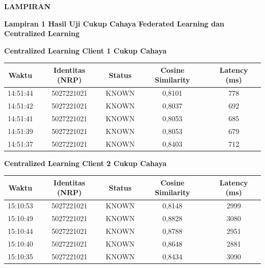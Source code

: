 \begin{center}
  \Large
  \textbf{LAMPIRAN}
\end{center}


\vspace{4ex}

\noindent\textbf{Lampiran 1 Hasil Uji Cukup Cahaya Federated Learning dan Centralized Learning}
\label{lampiran:1}

\vspace{2ex}

\noindent\textbf{Centralized Learning Client 1 Cukup Cahaya}
\begin{center}
  \small
  \begin{tabular}{|c|c|c|c|c|}
    \hline
    \textbf{Waktu} & \textbf{Identitas (NRP)} & \textbf{Status} & \textbf{Cosine Similarity} & \textbf{Latency (ms)} \\
    \hline
    14:51:44 & 5027221021 & KNOWN & 0,8101 & 778 \\
    14:51:42 & 5027221021 & KNOWN & 0,8037 & 692 \\
    14:51:41 & 5027221021 & KNOWN & 0,8053 & 685 \\
    14:51:39 & 5027221021 & KNOWN & 0,8053 & 679 \\
    14:51:37 & 5027221021 & KNOWN & 0,8403 & 712 \\
    \hline
  \end{tabular}
\end{center}

\noindent\textbf{Centralized Learning Client 2 Cukup Cahaya}
\begin{center}
  \small
  \begin{tabular}{|c|c|c|c|c|}
    \hline
    \textbf{Waktu} & \textbf{Identitas (NRP)} & \textbf{Status} & \textbf{Cosine Similarity} & \textbf{Latency (ms)} \\
    \hline
    15:10:53 & 5027221021 & KNOWN & 0,8148 & 2999 \\
    15:10:49 & 5027221021 & KNOWN & 0,8828 & 3080 \\
    15:10:44 & 5027221021 & KNOWN & 0,8788 & 2951 \\
    15:10:40 & 5027221021 & KNOWN & 0,8648 & 2881 \\
    15:10:35 & 5027221021 & KNOWN & 0,8434 & 3090 \\
    \hline
  \end{tabular}
\end{center}

